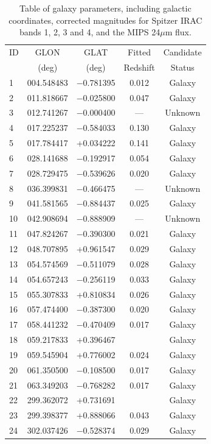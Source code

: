 \documentclass[times,usenatbib]{mn2e}
\begin{document}
\begin{table}
\begin{center}
\caption{Table of galaxy parameters, including galactic coordinates, corrected magnitudes for Spitzer IRAC bands 1, 2, 3 and 4, and the MIPS 24$\mu$m flux.}
\begin{tabular}{lcccc}
\hline
ID & GLON & GLAT & Fitted & Candidate \\
 & (deg) & (deg) & Redshift & Status \\
\hline
 1 & 004.548483 & $-$0.781395 & 0.012 & Galaxy \\
 2 & 011.818667 & $-$0.025800 & 0.047 & Galaxy \\
 3 & 012.741267 & $-$0.000400 & ---   & Unknown \\
 4 & 017.225237 & $-$0.584033 & 0.130 & Galaxy \\
 5 & 017.784417 & +0.034222 &   0.141 & Galaxy \\
 6 & 028.141688 & $-$0.192917 & 0.054 & Galaxy \\
 7 & 028.729475 & $-$0.539626 & 0.020 & Galaxy \\
 8 & 036.399831 & $-$0.466475 & ---   & Unknown \\
 9 & 041.581565 & $-$0.884437 & 0.025 & Galaxy \\
10 & 042.908694 & $-$0.888909 & ---   & Unknown \\
11 & 047.824267 & $-$0.390300 & 0.021 & Galaxy \\
12 & 048.707895 & +0.961547 &   0.029 & Galaxy \\
13 & 054.574569 & $-$0.511079 & 0.028 & Galaxy \\
14 & 054.657243 & $-$0.256119 & 0.033 & Galaxy \\
15 & 055.307833 & +0.810834 &   0.026 & Galaxy \\
16 & 057.474400 & $-$0.387300 & 0.020 & Galaxy \\
17 & 058.441232 & $-$0.470409 & 0.017 & Galaxy \\
18 & 059.217833 & +0.396467 &    & Galaxy \\
19 & 059.545904 & +0.776002 &   0.024 & Galaxy \\
20 & 061.350500 & $-$0.108500 & 0.017 & Galaxy \\
21 & 063.349203 & $-$0.768282 & 0.017 & Galaxy \\
22 & 299.362072 & +0.731691 &    & Galaxy \\
23 & 299.398377 & +0.888066 &   0.043 & Galaxy \\
24 & 302.037426 & $-$0.528374 & 0.029 & Galaxy \\

\end{tabular}
\end{center}
\end{table}
\end{document}
